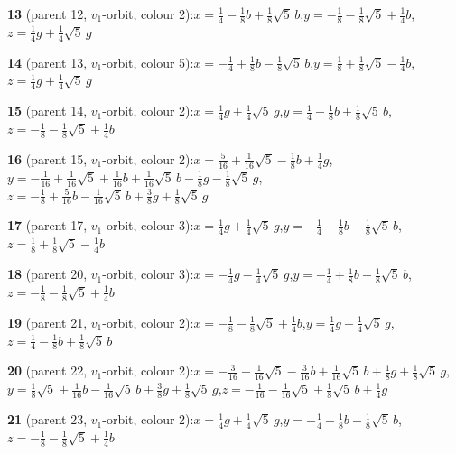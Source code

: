 \documentclass[10pt]{article}
\begin{document}
{\noindent\textbf{13} (parent 12, $v_1$-orbit, colour 2):\quad $x=\tfrac{1}{4}-\tfrac{1}{8}b+\tfrac{1}{8}\sqrt5\,b$,\quad $y=-\tfrac{1}{8}-\tfrac{1}{8}\sqrt5+\tfrac{1}{4}b$,\quad $z=\tfrac{1}{4}g+\tfrac{1}{4}\sqrt5\,g$\par\smallskip
\noindent\textbf{14} (parent 13, $v_1$-orbit, colour 5):\quad $x=-\tfrac{1}{4}+\tfrac{1}{8}b-\tfrac{1}{8}\sqrt5\,b$,\quad $y=\tfrac{1}{8}+\tfrac{1}{8}\sqrt5-\tfrac{1}{4}b$,\quad $z=\tfrac{1}{4}g+\tfrac{1}{4}\sqrt5\,g$\par\smallskip
\noindent\textbf{15} (parent 14, $v_1$-orbit, colour 2):\quad $x=\tfrac{1}{4}g+\tfrac{1}{4}\sqrt5\,g$,\quad $y=\tfrac{1}{4}-\tfrac{1}{8}b+\tfrac{1}{8}\sqrt5\,b$,\quad $z=-\tfrac{1}{8}-\tfrac{1}{8}\sqrt5+\tfrac{1}{4}b$\par\smallskip
\noindent\textbf{16} (parent 15, $v_1$-orbit, colour 2):\quad $x=\tfrac{5}{16}+\tfrac{1}{16}\sqrt5-\tfrac{1}{8}b+\tfrac{1}{4}g$,\quad $y=-\tfrac{1}{16}+\tfrac{1}{16}\sqrt5+\tfrac{1}{16}b+\tfrac{1}{16}\sqrt5\,b-\tfrac{1}{8}g-\tfrac{1}{8}\sqrt5\,g$,\quad $z=-\tfrac{1}{8}+\tfrac{5}{16}b-\tfrac{1}{16}\sqrt5\,b+\tfrac{3}{8}g+\tfrac{1}{8}\sqrt5\,g$\par\smallskip
\noindent\textbf{17} (parent 17, $v_1$-orbit, colour 3):\quad $x=\tfrac{1}{4}g+\tfrac{1}{4}\sqrt5\,g$,\quad $y=-\tfrac{1}{4}+\tfrac{1}{8}b-\tfrac{1}{8}\sqrt5\,b$,\quad $z=\tfrac{1}{8}+\tfrac{1}{8}\sqrt5-\tfrac{1}{4}b$\par\smallskip
\noindent\textbf{18} (parent 20, $v_1$-orbit, colour 3):\quad $x=-\tfrac{1}{4}g-\tfrac{1}{4}\sqrt5\,g$,\quad $y=-\tfrac{1}{4}+\tfrac{1}{8}b-\tfrac{1}{8}\sqrt5\,b$,\quad $z=-\tfrac{1}{8}-\tfrac{1}{8}\sqrt5+\tfrac{1}{4}b$\par\smallskip
\noindent\textbf{19} (parent 21, $v_1$-orbit, colour 2):\quad $x=-\tfrac{1}{8}-\tfrac{1}{8}\sqrt5+\tfrac{1}{4}b$,\quad $y=\tfrac{1}{4}g+\tfrac{1}{4}\sqrt5\,g$,\quad $z=\tfrac{1}{4}-\tfrac{1}{8}b+\tfrac{1}{8}\sqrt5\,b$\par\smallskip
\noindent\textbf{20} (parent 22, $v_1$-orbit, colour 2):\quad $x=-\tfrac{3}{16}-\tfrac{1}{16}\sqrt5-\tfrac{3}{16}b+\tfrac{1}{16}\sqrt5\,b+\tfrac{1}{8}g+\tfrac{1}{8}\sqrt5\,g$,\quad $y=\tfrac{1}{8}\sqrt5+\tfrac{1}{16}b-\tfrac{1}{16}\sqrt5\,b+\tfrac{3}{8}g+\tfrac{1}{8}\sqrt5\,g$,\quad $z=-\tfrac{1}{16}-\tfrac{1}{16}\sqrt5+\tfrac{1}{8}\sqrt5\,b+\tfrac{1}{4}g$\par\smallskip
\noindent\textbf{21} (parent 23, $v_1$-orbit, colour 2):\quad $x=\tfrac{1}{4}g+\tfrac{1}{4}\sqrt5\,g$,\quad $y=-\tfrac{1}{4}+\tfrac{1}{8}b-\tfrac{1}{8}\sqrt5\,b$,\quad $z=-\tfrac{1}{8}-\tfrac{1}{8}\sqrt5+\tfrac{1}{4}b$\par\smallskip
}
\end{document}
